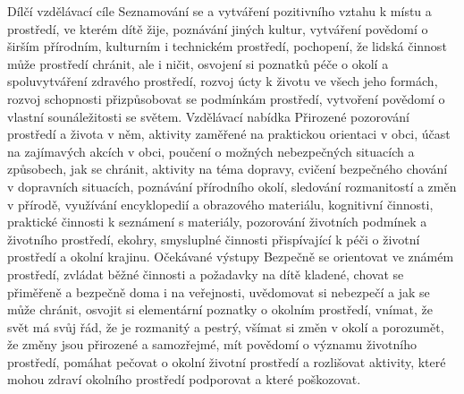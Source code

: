 	Dílčí vzdělávací cíle
	Seznamování se a vytváření pozitivního vztahu k místu a prostředí, ve kterém dítě žije, poznávání jiných kultur, vytváření povědomí o širším přírodním, kulturním i technickém prostředí, pochopení, že lidská činnost může prostředí chránit, ale i ničit, osvojení si poznatků péče o okolí a spoluvytváření zdravého prostředí, rozvoj úcty k životu ve všech jeho formách, rozvoj schopnosti přizpůsobovat se podmínkám prostředí, vytvoření povědomí o vlastní sounáležitosti se světem.
	Vzdělávací nabídka
	Přirozené pozorování prostředí a života v něm, aktivity zaměřené na praktickou orientaci v obci, účast na zajímavých akcích v obci, poučení o možných nebezpečných situacích a způsobech, jak se chránit, aktivity na téma dopravy, cvičení bezpečného chování v dopravních situacích, poznávání přírodního okolí, sledování rozmanitostí a změn v přírodě, využívání encyklopedií a obrazového materiálu, kognitivní činnosti, praktické činnosti k seznámení s materiály, pozorování životních podmínek a životního prostředí, ekohry, smysluplné činnosti přispívající k péči o životní prostředí a okolní krajinu.
	Očekávané výstupy
	Bezpečně se orientovat ve známém prostředí, zvládat běžné činnosti a požadavky na dítě kladené, chovat se přiměřeně a bezpečně doma i na veřejnosti, uvědomovat si nebezpečí a jak se může chránit, osvojit si elementární poznatky o okolním prostředí, vnímat, že svět má svůj řád, že je rozmanitý a pestrý, všímat si změn v okolí a porozumět, že změny jsou přirozené a samozřejmé, mít povědomí o významu životního prostředí, pomáhat pečovat o okolní životní prostředí a rozlišovat aktivity, které mohou zdraví okolního prostředí podporovat a které poškozovat.
